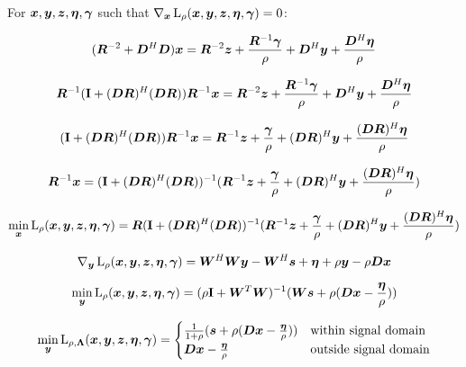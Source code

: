 \documentclass{article}
\begin{document}
For $\bm{x},\bm{y},\bm{z},\bm{\eta},\bm{\gamma}$ such that $\nabla_{\bm{x}}\operatorname{L}_{\rho}(\bm{x},\bm{y},\bm{z},\bm{\eta},\bm{\gamma}) = 0$:

\begin{equation}
(\bm{R}^{-2} + \bm{D}^H\bm{D})\bm{x} = \bm{R}^{-2}\bm{z} + \frac{\bm{R}^{-1} \bm{\gamma}}{\rho} + \bm{D}^H\bm{y} + \frac{\bm{D}^H\bm{\eta}}{\rho}
\end{equation}

\begin{equation}
\bm{R}^{-1}({\bf I} + (\bm{D}\bm{R})^H(\bm{D}\bm{R}))\bm{R}^{-1}\bm{x} = \bm{R}^{-2}\bm{z} + \frac{\bm{R}^{-1} \bm{\gamma}}{\rho} + \bm{D}^H\bm{y} + \frac{\bm{D}^H\bm{\eta}}{\rho}
\end{equation}

\begin{equation}
({\bf I} + (\bm{D}\bm{R})^H(\bm{D}\bm{R}))\bm{R}^{-1}\bm{x} = \bm{R}^{-1}\bm{z} + \frac{\bm{\gamma}}{\rho} + (\bm{D}\bm{R})^H\bm{y} + \frac{(\bm{D}\bm{R})^H\bm{\eta}}{\rho}
\end{equation}

\begin{equation}
\bm{R}^{-1}\bm{x} = ({\bf I} + (\bm{D}\bm{R})^H(\bm{D}\bm{R}))^{-1}(\bm{R}^{-1}\bm{z} + \frac{\bm{\gamma}}{\rho} + (\bm{D}\bm{R})^H\bm{y} + \frac{(\bm{D}\bm{R})^H\bm{\eta}}{\rho})
\end{equation}

\begin{equation}
\min_{\bm{x}} \operatorname{L}_{\rho}(\bm{x},\bm{y},\bm{z},\bm{\eta},\bm{\gamma}) = \bm{R}({\bf I} + (\bm{D}\bm{R})^H(\bm{D}\bm{R}))^{-1}(\bm{R}^{-1}\bm{z} + \frac{\bm{\gamma}}{\rho} + (\bm{D}\bm{R})^H\bm{y} + \frac{(\bm{D}\bm{R})^H\bm{\eta}}{\rho})
\end{equation}

\begin{equation}
\nabla_{\bm{y}}\operatorname{L}_{\rho}(\bm{x},\bm{y},\bm{z},\bm{\eta},\bm{\gamma}) = \bm{W}^H\bm{W}\bm{y} - \bm{W}^H\bm{s} + \bm{\eta} + \rho\bm{y} - \rho\bm{D}\bm{x}
\end{equation}

\begin{equation}
\min_{\bm{y}} \operatorname{L}_{\rho}(\bm{x},\bm{y},\bm{z},\bm{\eta},\bm{\gamma}) = (\rho{\bf I} + \bm{W}^T\bm{W})^{-1}(\bm{W}\bm{s} + \rho(\bm{D}\bm{x} - \frac{\bm{\eta}}{\rho}))
\end{equation}

\begin{equation}
\min_{\bm{y}} \operatorname{L}_{\rho,\bm{\Lambda}}(\bm{x},\bm{y},\bm{z},\bm{\eta},\bm{\gamma}) = \begin{cases}
\frac{1}{1 + \rho}(\bm{s} + \rho(\bm{D}\bm{x} - \frac{\bm{\eta}}{\rho})) & \text{within signal domain}\\
\bm{D}\bm{x} - \frac{\bm{\eta}}{\rho} & \text{outside signal domain}
\end{cases}
\end{equation}
\end{document}
